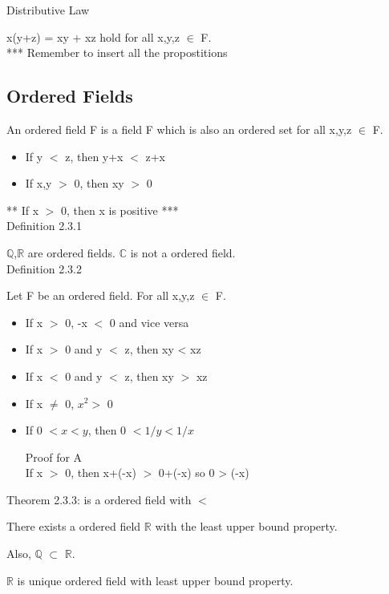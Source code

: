 Distributive Law

\qquad x(y+z) = xy + xz hold for all x,y,z $\in$ F. \\

*** Remember to insert all the propostitions


\subsection{Ordered Fields}

\qquad An ordered field F is a field F which is also an ordered set for all x,y,z $\in$ F.

\begin{itemize}[leftmargin=2cm]
	\item If y $<$ z, then y+x $<$ z+x
	\item If x,y $>$ 0, then xy $>$ 0
\end{itemize}
\qquad *** If x $>$ 0, then x is positive *** \\

{ \color{blue} Definition 2.3.1} 

\qquad $ \mathbb{Q} $,$ \mathbb{R} $ are ordered fields. $ \mathbb{C} $ is not a ordered field. \\

{ \color{blue} Definition 2.3.2} 

\qquad Let F be an ordered field. For all x,y,z $\in$ F.
\begin{itemize}[leftmargin=2cm]
	\item If x $>$ 0, -x $<$ 0 and vice versa
	\item If x $>$ 0 and y $<$ z, then xy < xz
	\item If x $ < $ 0 and y $ < $ z, then xy $ > $ xz
	\item If x $\neq$ 0, $x^2 > $ 0
	\item If 0 $< x < y$, then 0 $< 1/y < 1/x$
	
	\qquad Proof for A \\
	If x $>$ 0, then x+(-x) $>$ 0+(-x) so 0 > (-x)
\end{itemize}

{\color{blue} Theorem 2.3.3:  is a ordered field with $<$ }

\qquad There exists a ordered field $ \mathbb{R} $ with the least upper bound property.

\qquad Also, $ \mathbb{Q} $  $\subset$ $ \mathbb{R} $.

\qquad $ \mathbb{R} $ is unique ordered field with least upper bound property. \\

